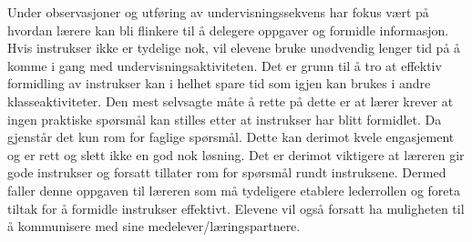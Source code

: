 \documentclass[main.tex]{subfiles}
\begin{document}
Under observasjoner og utføring av undervisningssekvens har fokus vært på hvordan 
lærere kan bli flinkere til å delegere oppgaver og formidle 
informasjon. Hvis instrukser ikke er tydelige nok, vil elevene bruke unødvendig 
lenger tid på å komme i gang med undervisningsaktiviteten. Det 
er grunn til å tro at effektiv formidling av instrukser kan i 
helhet spare tid som igjen kan brukes i andre klasseaktiviteter. Den mest selvsagte måte
å rette på dette er at lærer krever at ingen praktiske
spørsmål kan stilles etter at instrukser har blitt formidlet. Da gjenstår
det kun rom for faglige spørsmål. Dette kan derimot kvele engasjement og er
rett og slett ikke en god nok løsning. Det er derimot viktigere at læreren
gir gode instrukser og forsatt tillater rom for spørsmål rundt instruksene.
Dermed faller denne oppgaven til læreren som må tydeligere
etablere lederrollen og foreta tiltak for å formidle instrukser 
effektivt. Elevene vil også forsatt ha muligheten til å kommunisere med sine 
medelever/læringspartnere.
\end{document}

